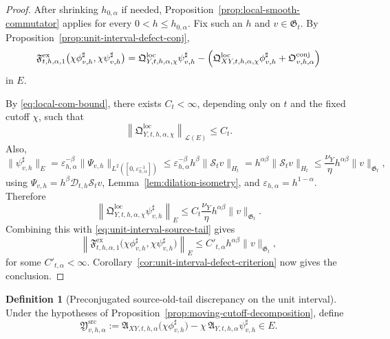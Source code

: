 \documentclass[11pt,a4paper]{amsart}
\theoremstyle{plain}
\theoremstyle{definition}
\newtheorem{definition}[theorem]{Definition}
\theoremstyle{remark}
\begin{document}
\begin{proof}
After shrinking \(h_{0,\alpha}\) if needed, Proposition~\ref{prop:local-smooth-commutator} applies
for every \(0<h\le h_{0,\alpha}\). Fix such an \(h\) and \(v\in\mathfrak G_t\). By
Proposition~\ref{prop:unit-interval-defect-conj},
\[
\mathfrak F_{t,h,\alpha,1}^{\mathrm{ex}}
\bigl(
\chi\phi_{v,h}^{\sharp},
\chi\psi_{v,h}^{\sharp}
\bigr)
=
\mathfrak Q_{Y,t,h,\alpha,\chi}^{\mathrm{loc}}\psi_{v,h}^{\sharp}
-\Bigl(
\mathfrak Q_{XY,t,h,\alpha,\chi}^{\mathrm{loc}}\phi_{v,h}^{\sharp}
+
\mathfrak O_{v,h,\alpha}^{\mathrm{conj}}
\Bigr)
\]
in \(E\).

By \eqref{eq:local-com-bound}, there exists \(C_t<\infty\), depending only on \(t\) and the fixed
cutoff \(\chi\), such that
\[
\left\|
\mathfrak Q_{Y,t,h,\alpha,\chi}^{\mathrm{loc}}
\right\|_{\mathcal L(E)}
\le
C_t.
\]
Also,
\[
\|\psi_{v,h}^{\sharp}\|_{E}
=
\varepsilon_{h,\alpha}^{-\beta}
\|\Psi_{v,h}\|_{L^2([0,\varepsilon_{h,\alpha}^{-1}])}
\le
\varepsilon_{h,\alpha}^{-\beta}h^\beta\|\mathcal S_t v\|_{H_t}
=
h^{\alpha\beta}\|\mathcal S_t v\|_{H_t}
\le
\frac{\nu_Y}{\eta}h^{\alpha\beta}\|v\|_{\mathfrak G_t},
\]
using \(\Psi_{v,h}=h^\beta\mathcal D_{t,h}\mathcal S_t v\), Lemma~\ref{lem:dilation-isometry}, and
\(\varepsilon_{h,\alpha}=h^{1-\alpha}\). Therefore
\[
\left\|
\mathfrak Q_{Y,t,h,\alpha,\chi}^{\mathrm{loc}}\psi_{v,h}^{\sharp}
\right\|_{E}
\le
C_t\frac{\nu_Y}{\eta}h^{\alpha\beta}\|v\|_{\mathfrak G_t}.
\]
Combining this with \eqref{eq:unit-interval-source-tail} gives
\[
\left\|
\mathfrak F_{t,h,\alpha,1}^{\mathrm{ex}}
\bigl(
\chi\phi_{v,h}^{\sharp},
\chi\psi_{v,h}^{\sharp}
\bigr)
\right\|_{E}
\le
C'_{t,\alpha}h^{\alpha\beta}\|v\|_{\mathfrak G_t},
\]
for some \(C'_{t,\alpha}<\infty\). Corollary~\ref{cor:unit-interval-defect-criterion} now gives the
conclusion.
\end{proof}

\begin{definition}[Preconjugated source-old-tail discrepancy on the unit interval]
\label{def:unit-interval-source-preconj}
Under the hypotheses of Proposition~\ref{prop:moving-cutoff-decomposition}, define
\begin{equation}\label{eq:unit-interval-source-preconj}
\mathfrak Y_{v,h,\alpha}^{\mathrm{src}}
:=
\mathfrak A_{XY,t,h,\alpha}
\bigl(
\chi\phi_{v,h}^{\sharp}
\bigr)
-
\chi\,\mathfrak A_{Y,t,h,\alpha}\psi_{v,h}^{\sharp}
\in E.
\end{equation}
\end{definition}
\end{document}
